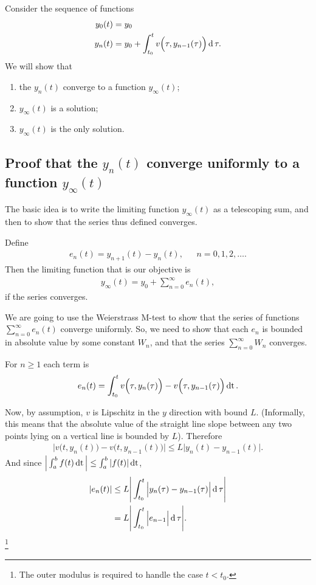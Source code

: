 Consider the sequence of functions
\begin{align*}
  y_0(t) &= y_0\\
  y_n(t) &= y_0 + \int_{t_0}^t v\Big(\tau, y_{n-1}(\tau)\Big) \operatorname{\text{d}}\tau.\\
\end{align*}
We will show that
\begin{enumerate}
\item the $y_n(t)$ converge to a function $y_\infty(t)$;
\item $y_\infty(t)$ is a solution;
\item $y_\infty(t)$ is the only solution.
\end{enumerate}

\subsection{Proof that the $y_n(t)$ converge uniformly to a function $y_\infty(t)$}
The basic idea is to write the limiting function $y_\infty(t)$ as a telescoping
sum, and then to show that the series thus defined converges.

Define
\begin{align*}
  e_n(t) = y_{n+1}(t) - y_n(t), ~~~~~~~ n = 0, 1, 2, \ldots.
\end{align*}
Then the limiting function that is our objective is
\begin{align*}
  y_\infty(t) = y_0 + \sum_{n=0}^\infty e_n(t),
\end{align*}
if the series converges.

We are going to use the Weierstrass M-test to show that the series of functions
$\sum_{n=0}^\infty e_n(t)$ converge uniformly. So, we need to show that each
$e_n$ is bounded in absolute value by some constant $W_n$, and that the series
$\sum_{n=0}^\infty W_n$ converges.

For $n \geq 1$ each term is
\begin{align*}
  e_{n}(t) = \int_{t_0}^t v\Big(\tau, y_n(\tau)\Big) -
                         v\Big(\tau, y_{n-1}(\tau)\Big) \operatorname{\text{dt}}.
\end{align*}

Now, by assumption, $v$ is Lipschitz in the $y$ direction with bound
$L$. (Informally, this means that the absolute value of the straight line slope
between any two points lying on a vertical line is bounded by $L$). Therefore
\begin{align*}
      \Big|v\Big(t, y_n(t)\Big) -
           v\Big(t, y_{n-1}(t)\Big)\Big|
\leq L\Big|y_n(t) - y_{n-1}(t)\Big|.
\end{align*}
And since $\Big|\int_a^b f(t) \operatorname{\text{dt}}\Big| \leq \int_a^b |f(t)| \operatorname{\text{dt}}$,
\begin{align*}
  |e_n(t)|
  &\leq L\Bigg|\int_{t_0}^t \Big|y_n(\tau) - y_{n-1}(\tau)\Big| \operatorname{\text{d}}\tau \Bigg|\\
  &   = L\Bigg|\int_{t_0}^t \Big|e_{n-1}\Big| \operatorname{\text{d}}\tau \Bigg|.
\end{align*}
\footnote{The outer modulus is required to handle the case $t < t_0$.}

